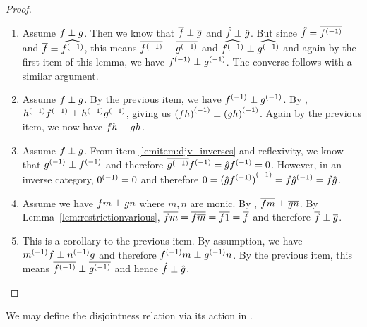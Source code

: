 \begin{proof}
  \prepprooflist
  \begin{enumerate}[{(}i{)}]
    \item Assume $f \perp g$. Then we know that $\overline{f} \perp \overline{g}$ and
      $\hat{f}\perp\hat{g}$. But since $\hat{f} = \overline{{f}^{(-1)}}$ and $\overline{f} = \widehat{{f}^{(-1)}}$, this
      means $\overline{{f}^{(-1)}} \perp \overline{{g}^{(-1)}}$ and $\widehat{{f}^{(-1)}}\perp\widehat{{g}^{(-1)}}$ and again
      by the first item of this lemma, we have ${f}^{(-1)} \perp {g}^{(-1)}$. The converse follows with
      a similar argument.
    \item Assume $f \perp g$. By the previous item, we have ${f}^{(-1)}\perp{g}^{(-1)}$. By
      , ${h}^{(-1)}{f}^{(-1)}\perp{h}^{(-1)}{g}^{(-1)}$, giving us ${(f h)}^{(-1)} \perp
      {(g h)}^{(-1)}$. Again by the previous item, we now have $f h \perp g h$.
    \item Assume $f \perp g$. From item \ref{lemitem:djv_inverses} and reflexivity, we know that
      ${g}^{(-1)}
      \perp {f}^{(-1)}$ and therefore $\overline{{g}^{(-1)}}{f}^{(-1)} = \hat{g}{f}^{(-1)}= 0$. However, in an
      inverse category, ${0}^{(-1)} = 0$ and therefore $0 = {(\hat{g}{f}^{(-1)})}^{(-1)} = f {\hat{g}}^{(-1)} = f
      \hat{g}$.
    \item Assume we have $f m \perp g n$ where $m, n$ are monic. By ,
      $\overline{f m} \perp \overline{g n}$. By Lemma~\ref{lem:restrictionvarious}, $\overline{f m} = \overline{f
      \overline{m}} = \overline{f 1} = \overline{f}$ and therefore $\overline{f} \perp \overline{g}$.
    \item This is a corollary to the previous item. By assumption, we have ${m}^{(-1)} f \perp
      {n}^{(-1)}g$ and therefore ${f}^{(-1)}m \perp {g}^{(-1)} n$. By the previous item, this means
      $\overline{{f}^{(-1)}} \perp \overline{{g}^{(-1)}}$ and hence $\hat{f} \perp \hat{g}$.
  \end{enumerate}
\end{proof}

We may define the disjointness relation via its action in .

